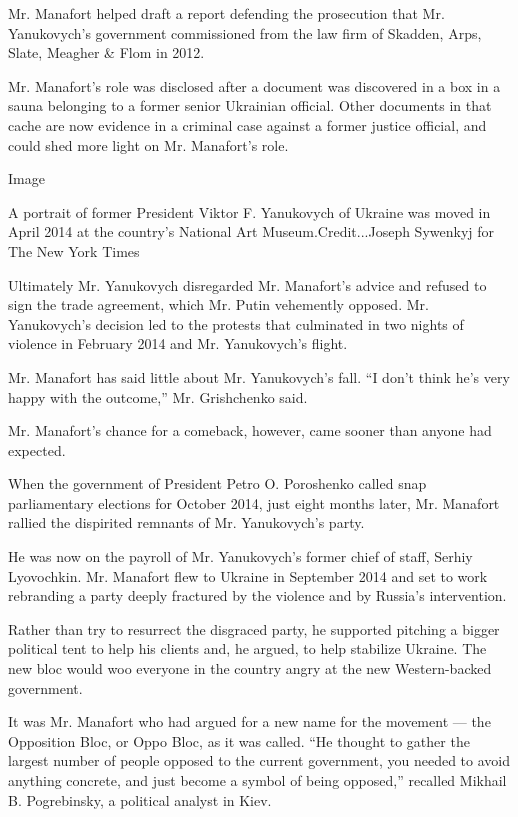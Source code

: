 Mr. Manafort helped draft a report defending the prosecution that Mr.
Yanukovych's government commissioned from the law firm of Skadden, Arps,
Slate, Meagher \& Flom in 2012.

Mr. Manafort's role was disclosed after a document was discovered in a
box in a sauna belonging to a former senior Ukrainian official. Other
documents in that cache are now evidence in a criminal case against a
former justice official, and could shed more light on Mr. Manafort's
role.

Image

A portrait of former President Viktor F. Yanukovych of Ukraine was moved
in April 2014 at the country's National Art Museum.Credit...Joseph
Sywenkyj for The New York Times

Ultimately Mr. Yanukovych disregarded Mr. Manafort's advice and refused
to sign the trade agreement, which Mr. Putin vehemently opposed. Mr.
Yanukovych's decision led to the protests that culminated in two nights
of violence in February 2014 and Mr. Yanukovych's flight.

Mr. Manafort has said little about Mr. Yanukovych's fall. ``I don't
think he's very happy with the outcome,'' Mr. Grishchenko said.

Mr. Manafort's chance for a comeback, however, came sooner than anyone
had expected.

When the government of President Petro O. Poroshenko called snap
parliamentary elections for October 2014, just eight months later, Mr.
Manafort rallied the dispirited remnants of Mr. Yanukovych's party.

He was now on the payroll of Mr. Yanukovych's former chief of staff,
Serhiy Lyovochkin. Mr. Manafort flew to Ukraine in September 2014 and
set to work rebranding a party deeply fractured by the violence and by
Russia's intervention.

Rather than try to resurrect the disgraced party, he supported pitching
a bigger political tent to help his clients and, he argued, to help
stabilize Ukraine. The new bloc would woo everyone in the country angry
at the new Western-backed government.

It was Mr. Manafort who had argued for a new name for the movement ---
the Opposition Bloc, or Oppo Bloc, as it was called. ``He thought to
gather the largest number of people opposed to the current government,
you needed to avoid anything concrete, and just become a symbol of being
opposed,'' recalled Mikhail B. Pogrebinsky, a political analyst in Kiev.

